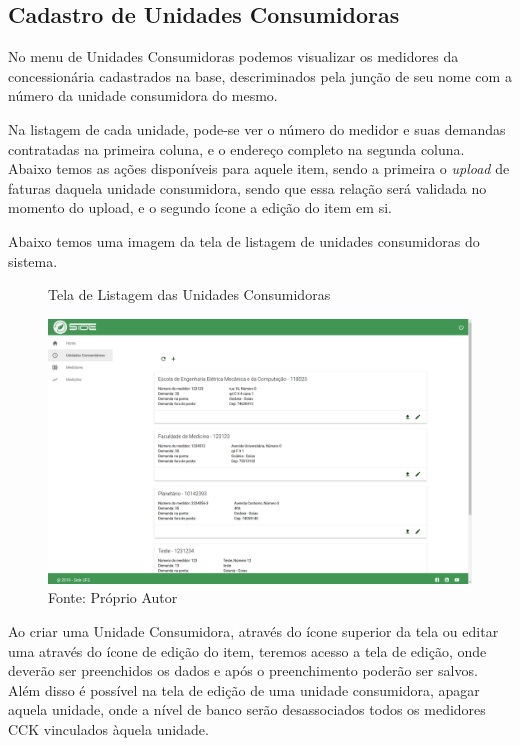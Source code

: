 \subsection{Cadastro de Unidades Consumidoras}

No menu de Unidades Consumidoras podemos visualizar os medidores da concessionária cadastrados na base, descriminados pela junção de seu nome com a número da unidade consumidora do mesmo.

Na listagem de cada unidade, pode-se ver o número do medidor e suas demandas contratadas na primeira coluna, e o endereço completo na segunda coluna. Abaixo temos as ações disponíveis para aquele item, sendo a primeira o \textit{upload} de faturas daquela unidade consumidora, sendo que essa relação será validada no momento do upload, e o segundo ícone a edição do item em si.

Abaixo temos uma imagem da tela de listagem de unidades consumidoras do sistema.

\begin{figure}[H]
    \centering
    \caption{Tela de Listagem das Unidades Consumidoras}
\includegraphics[width=\linewidth]{imagens/side/side-uc-list.png}
    \caption*{Fonte: Próprio Autor}
    \label{fig:side-uc-list}
\end{figure}

Ao criar uma Unidade Consumidora, através do ícone superior da tela ou editar uma através do ícone de edição do item, teremos acesso a tela de edição, onde deverão ser preenchidos os dados e após o preenchimento poderão ser salvos. Além disso é possível na tela de edição de uma unidade consumidora, apagar aquela unidade, onde a nível de banco serão desassociados todos os medidores CCK vinculados àquela unidade. 

